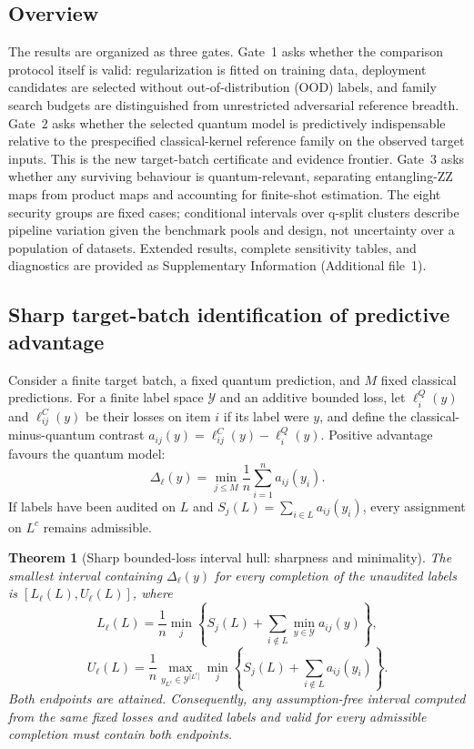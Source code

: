 \documentclass[referee,lineno,pdflatex,sn-vancouver-num]{sn-jnl}
\theoremstyle{thmstyleone}%
\newtheorem{theorem}{Theorem}%
\theoremstyle{thmstyletwo}%
\theoremstyle{thmstylethree}%
\begin{document}
\subsection{Overview}

The results are organized as three gates. Gate~1 asks whether the comparison protocol itself is valid: regularization is fitted on training data, deployment candidates are selected without out-of-distribution (OOD) labels, and family search budgets are distinguished from unrestricted adversarial reference breadth. Gate~2 asks whether the selected quantum model is predictively indispensable relative to the prespecified classical-kernel reference family on the observed target inputs. This is the new target-batch certificate and evidence frontier. Gate~3 asks whether any surviving behaviour is quantum-relevant, separating entangling-ZZ maps from product maps and accounting for finite-shot estimation. The eight security groups are fixed cases; conditional intervals over q-split clusters describe pipeline variation given the benchmark pools and design, not uncertainty over a population of datasets. Extended results, complete sensitivity tables, and diagnostics are provided as Supplementary Information (Additional file~1).

\subsection{Sharp target-batch identification of predictive advantage}
\label{sec:res_certificate}

Consider a finite target batch, a fixed quantum prediction, and $M$ fixed classical predictions. For a finite label space $\mathcal Y$ and an additive bounded loss, let $\ell_i^Q(y)$ and $\ell_{ij}^C(y)$ be their losses on item $i$ if its label were $y$, and define the classical-minus-quantum contrast $a_{ij}(y)=\ell_{ij}^C(y)-\ell_i^Q(y)$. Positive advantage favours the quantum model:
\[
\Delta_\ell(y)=\min_{j\leq M}\frac1n\sum_{i=1}^n a_{ij}(y_i).
\]
If labels have been audited on $L$ and $S_j(L)=\sum_{i\in L}a_{ij}(y_i)$, every assignment on $L^c$ remains admissible.

\begin{theorem}[Sharp bounded-loss interval hull: sharpness and minimality]
\label{thm:bounded_loss}
The smallest interval containing $\Delta_\ell(y)$ for every completion of the unaudited labels is $[L_\ell(L),U_\ell(L)]$, where
\[
L_\ell(L)=\frac1n\min_j\left\{S_j(L)+
\sum_{i\notin L}\min_{y\in\mathcal Y}a_{ij}(y)\right\},
\]
\[
U_\ell(L)=\frac1n\max_{y_{L^c}\in\mathcal Y^{|L^c|}}
\min_j\left\{S_j(L)+\sum_{i\notin L}a_{ij}(y_i)\right\}.
\]
Both endpoints are attained. Consequently, any assumption-free interval computed from the same fixed losses and audited labels and valid for every admissible completion must contain both endpoints.
\end{theorem}
\end{document}
